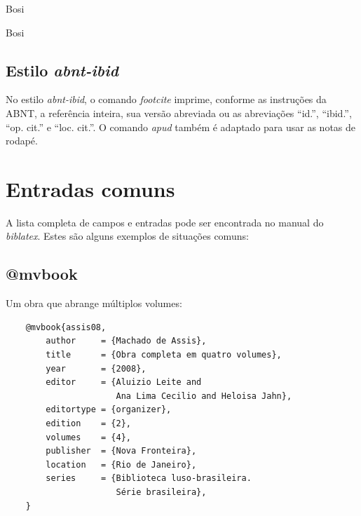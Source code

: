 \documentclass[a4paper]{article}
\begin{document}
\begin{example}
\textcite{bosi08}
\end{example}

\begin{example}
Bosi \cite{bosi08}
\end{example}

\begin{example}
Bosi \supercite{bosi08}
\end{example}


\begingroup
\let\clearpage\relax
\subsection{Estilo \textit{abnt-ibid}}%
\endgroup

No estilo \textit{abnt-ibid}, o comando \textit{footcite} imprime, conforme as
instruções da ABNT, a referência inteira, sua versão abreviada ou as
abreviações ``id.'', ``ibid.'', ``op. cit.'' e ``loc. cit.''. O comando
\textit{apud} também é adaptado para usar as notas de rodapé.



\clearpage
\section{Entradas comuns}%

A lista completa de campos e entradas pode ser encontrada no manual do
\textit{biblatex}. Estes são alguns exemplos de situações comuns:

\begingroup
\let\clearpage\relax
\subsection{@mvbook}%
\endgroup

Um obra que abrange múltiplos volumes:

\begin{verbatim}
    @mvbook{assis08,
        author     = {Machado de Assis},
        title      = {Obra completa em quatro volumes},
        year       = {2008},
        editor     = {Aluizio Leite and
                      Ana Lima Cecilio and Heloisa Jahn},
        editortype = {organizer},
        edition    = {2},
        volumes    = {4},
        publisher  = {Nova Fronteira},
        location   = {Rio de Janeiro},
        series     = {Biblioteca luso-brasileira.
                      Série brasileira},
    }
\end{verbatim}
\end{document}
